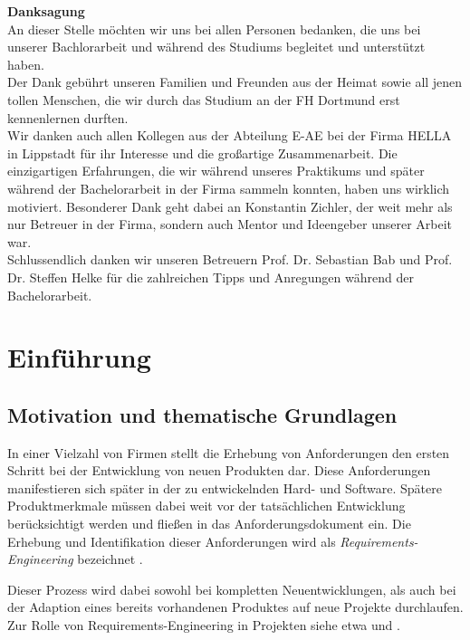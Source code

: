 \documentclass[12pt]{report}
\begin{document}
\thispagestyle{empty}
\textbf{Danksagung}
\vspace{12pt} \\
An dieser Stelle möchten wir uns bei allen Personen bedanken, die uns bei unserer Bachlorarbeit und während des Studiums begleitet und unterstützt haben.
\vspace{12pt} \\
Der Dank gebührt unseren Familien und Freunden aus der Heimat sowie all jenen tollen Menschen, die wir durch das Studium an der FH Dortmund erst kennenlernen durften.
\vspace{12pt} \\
Wir danken auch allen Kollegen aus der Abteilung E-AE bei der Firma HELLA in Lippstadt für ihr Interesse und die großartige Zusammenarbeit. Die einzigartigen Erfahrungen, die wir während unseres Praktikums und später während der Bachelorarbeit in der Firma sammeln konnten, haben uns wirklich motiviert. Besonderer Dank geht dabei an Konstantin Zichler, der weit mehr als nur Betreuer in der Firma, sondern auch Mentor und Ideengeber unserer Arbeit war.
\vspace{12pt} \\
Schlussendlich danken wir unseren Betreuern Prof. Dr. Sebastian Bab und Prof. Dr. Steffen Helke für die zahlreichen Tipps und Anregungen während der Bachelorarbeit.
\newpage

\newpage
\chapter{Einführung}
\section[Motivation]{Motivation und thematische Grundlagen}
In einer Vielzahl von Firmen stellt die Erhebung von Anforderungen den ersten Schritt bei der Entwicklung von neuen Produkten dar. Diese Anforderungen manifestieren sich später in der zu entwickelnden Hard- und Software. Spätere Produktmerkmale müssen dabei weit vor der tatsächlichen Entwicklung berücksichtigt werden und fließen in das Anforderungsdokument ein. Die Erhebung und Identifikation dieser Anforderungen wird als \textit{Requirements-Engineering} bezeichnet \cite{bal10}.

Dieser Prozess wird dabei sowohl bei kompletten Neuentwicklungen, als auch bei der Adaption eines bereits vorhandenen Produktes auf neue Projekte durchlaufen. Zur Rolle von Requirements-Engineering in Projekten siehe etwa \cite{mw02} und \cite{hl01}. 
\end{document}

